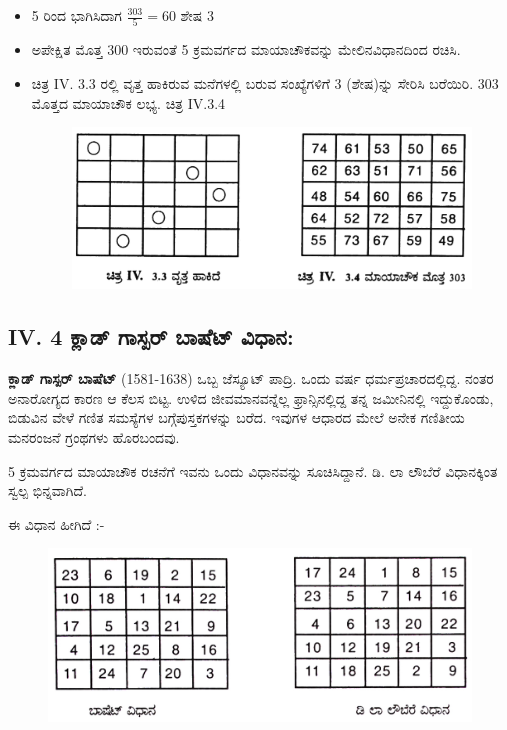 \begin{itemize}
	\item 5 ರಿಂದ ಭಾಗಿಸಿದಾಗ $\frac{303}{5}=60$ ಶೇಷ 3
	\item ಅಪೇಕ್ಷಿತ ಮೊತ್ತ 300 ಇರುವಂತೆ 5 ಕ್ರಮವರ್ಗದ ಮಾಯಾಚೌಕವನ್ನು ಮೇಲಿನ\break ವಿಧಾನದಿಂದ ರಚಿಸಿ.
	\item ಚಿತ್ರ IV. 3.3 ರಲ್ಲಿ ವೃತ್ತ ಹಾಕಿರುವ ಮನೆಗಳಲ್ಲಿ ಬರುವ ಸಂಖ್ಯೆಗಳಿಗೆ 3 (ಶೇಷ)ನ್ನು ಸೇರಿಸಿ ಬರೆಯಿರಿ. 303 ಮೊತ್ತದ ಮಾಯಾಚೌಕ ಲಭ್ಯ. ಚಿತ್ರ IV.3.4
	\begin{figure}[H]
	\includegraphics[scale=.9]{src/figures/chap3/fig3.42.jpg}
	\end{figure}
\end{itemize}

\subsection*{IV. 4 ಕ್ಲಾಡ್ ಗಾಸ್ಪರ್ ಬಾಷೆಟ್ ವಿಧಾನ:}

\textbf{ಕ್ಲಾಡ್ ಗಾಸ್ಪರ್ ಬಾಷೆಟ್} (1581-1638) ಒಬ್ಬ ಜೆಸ್ಯೂಟ್ ಪಾದ್ರಿ. ಒಂದು ವರ್ಷ ಧರ್ಮ\-ಪ್ರಚಾರದಲ್ಲಿದ್ದ. ನಂತರ ಅನಾರೋಗ್ಯದ ಕಾರಣ ಆ ಕೆಲಸ ಬಿಟ್ಟ. ಉಳಿದ ಜೀವಮಾನ\-ವನ್ನೆಲ್ಲ ಫ್ರಾನ್ಸಿನಲ್ಲಿದ್ದ ತನ್ನ ಜಮೀನಿನಲ್ಲಿ ಇದ್ದುಕೊಂಡು, ಬಿಡುವಿನ ವೇಳೆ ಗಣಿತ ಸಮಸ್ಯೆಗಳ ಬಗ್ಗೆ\break ಪುಸ್ತಕಗಳನ್ನು ಬರೆದ. ಇವುಗಳ ಆಧಾರದ ಮೇಲೆ ಅನೇಕ ಗಣಿತೀಯ ಮನರಂಜನೆ ಗ್ರಂಥಗಳು ಹೊರಬಂದವು.

5 ಕ್ರಮವರ್ಗದ ಮಾಯಾಚೌಕ ರಚನೆಗೆ ಇವನು ಒಂದು ವಿಧಾನವನ್ನು ಸೂಚಿಸಿದ್ದಾನೆ. ಡಿ. ಲಾ ಲೌಬೆರೆ ವಿಧಾನಕ್ಕಿಂತ ಸ್ವಲ್ಪ ಭಿನ್ನವಾಗಿದೆ.

ಈ ವಿಧಾನ ಹೀಗಿದೆ :-
\begin{figure}[H]
\includegraphics[scale=.9]{src/figures/chap3/fig3.43.jpg}
\end{figure}

